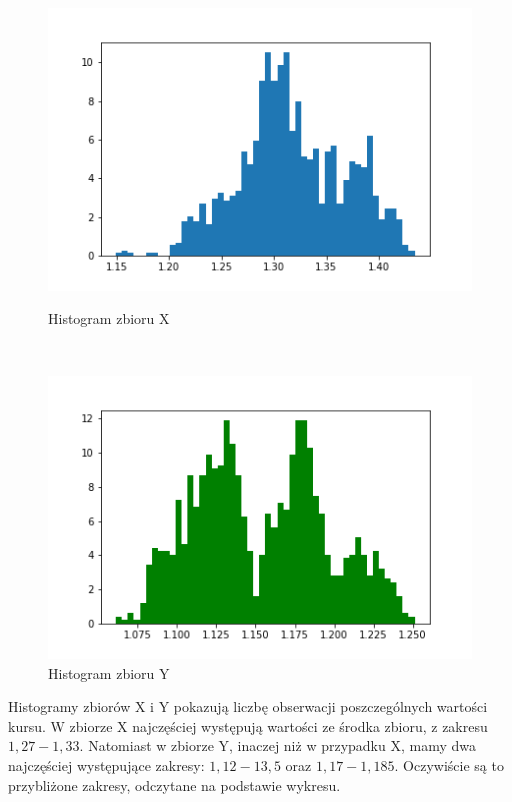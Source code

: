 \documentclass[12pt]{mwart}
\begin{document}
\begin{figure}[H]
	\begin{minipage}{.5\linewidth}
		\centering
		\includegraphics[scale=0.7]{X_hist.PNG}
		\caption{Histogram zbioru X}
	\end{minipage}
	$\quad$
	\begin{minipage}{.5\linewidth}
		\centering
		\includegraphics[scale=0.7]{Y_hist.PNG}
		\caption{Histogram zbioru Y}
	\end{minipage}
\end{figure}
\noindent Histogramy zbiorów X i Y pokazują liczbę obserwacji poszczególnych wartości kursu. W zbiorze X najczęściej występują wartości ze środka zbioru, z zakresu $1,27-1,33$. Natomiast w zbiorze Y, inaczej niż w przypadku X, mamy dwa najczęściej występujące zakresy: $1,12-13,5$ oraz $1,17-1,185$. Oczywiście są to przybliżone zakresy, odczytane na podstawie wykresu.
\end{document}
